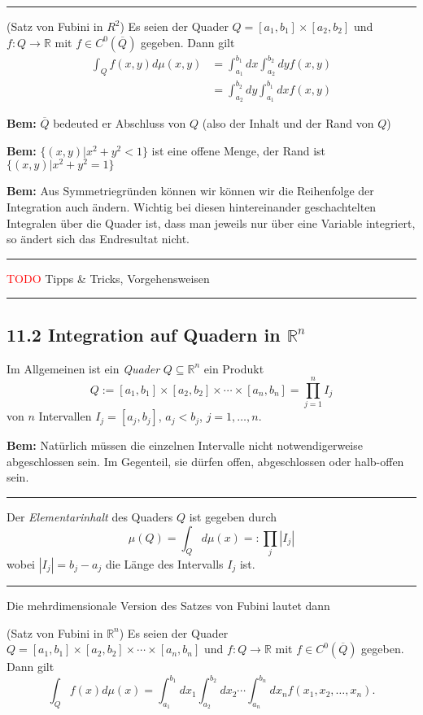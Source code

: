 \documentclass[a4paper,landscape,8pt]{extarticle}
\newcommand{\R}{\mathbb{R}}
\newcommand{\abs}[1]{\left\lvert #1 \right\rvert}
\newcommand{\todo}{\textcolor{red}{TODO }}
\newcommand{\sep}{\vspace{5pt}\noindent\hrule\vspace{5pt}}
\newcommand{\Bem}{\textbf{Bem: }}
\begin{document}
\begin{multicols*}{4}
\sep

\Satz (Satz von Fubini in $R^2$) Es seien der Quader
$Q=[a_1,b_1]\times[a_2,b_2]$ und $f\colon Q\to\R$ mit $f\in C^0(\overline{Q})$
gegeben. Dann gilt
\begin{align*}
\int_Q f(x,y) d\mu(x,y) 
&=\int_{a_1}^{b_1}dx\int_{a_2}^{b_2}dy f(x,y)\\
&=\int_{a_2}^{b_2}dy \int_{a_1}^{b_1}dx f(x,y)
\end{align*}


\Bem $\overline{Q}$ bedeuted er Abschluss von $Q$ (also der Inhalt und der Rand
von $Q$)

\Bem $\{(x,y)| x^2+y^2 < 1\}$ ist eine offene Menge, der Rand ist
$\{(x,y)|x^2+y^2=1\}$

\Bem Aus Symmetriegründen können wir können wir die Reihenfolge der Integration
auch ändern. Wichtig bei diesen hintereinander geschachtelten Integralen über
die Quader ist, dass man jeweils nur über eine Variable integriert, so ändert
sich das Endresultat nicht.

\begin{warmup}
\sep

\todo Tipps \& Tricks, Vorgehensweisen

\sep

\end{warmup}

\subsection{11.2 Integration auf Quadern in $\R^n$}

\Def Im Allgemeinen ist ein \emph{Quader} $Q\subseteq \R^n$ ein Produkt
\[
Q:=[a_1,b_1]\times[a_2,b_2]\times\cdots\times[a_n,b_n] = \prod_{j=1}^nI_j
\]
von $n$ Intervallen $I_j=[a_j,b_j]$, $a_j<b_j$, $j=1,\ldots,n$.

\Bem Natürlich müssen die einzelnen Intervalle nicht notwendigerweise
abgeschlossen sein. Im Gegenteil, sie dürfen offen, abgeschlossen oder
halb-offen sein.

\sep

\Def Der \emph{Elementarinhalt} des Quaders $Q$ ist gegeben durch
\[
\mu(Q)=\int_Q d\mu(x) =: \prod_{j}\abs{I_j}
\]
wobei $\abs{I_j}=b_j-a_j$ die Länge des Intervalls $I_j$ ist.

\sep

Die mehrdimensionale Version des Satzes von Fubini lautet dann

\Satz (Satz von Fubini in $\R^n$) Es seien der Quader $Q=[a_1,b_1]\times
[a_2,b_2] \times \cdots \times [a_n,b_n]$ und $f\colon Q\to\R$ mit $f\in
C^{0}(\overline{Q})$ gegeben. Dann gilt
\[
\int_{Q} f(x) d\mu(x) = 
\int_{a_1}^{b_1}dx_1
\int_{a_2}^{b_2}dx_2
\cdots
\int_{a_n}^{b_n}dx_n
f(x_1,x_2,\ldots,x_n).
\]


\end{multicols*}
\end{document}
